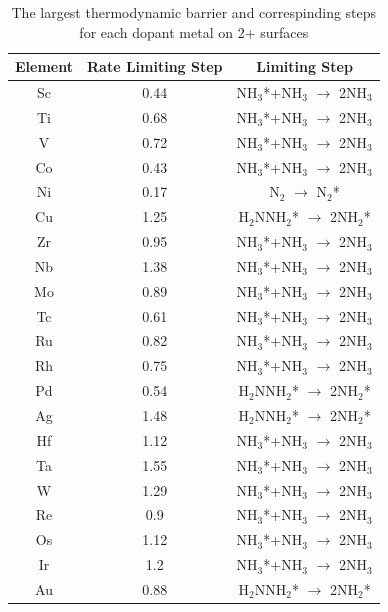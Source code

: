 \begin{table}
\begin{center}
\begin{tabular}{| c | c |c |}
\hline
Element & Rate Limiting Step & Limiting Step \\
\hline
Sc & 0.44 & NH$_3$*+NH$_3$ $\rightarrow$ 2NH$_3$\\
Ti & 0.68 & NH$_3$*+NH$_3$ $\rightarrow$ 2NH$_3$\\
V & 0.72 & NH$_3$*+NH$_3$ $\rightarrow$ 2NH$_3$\\
Co & 0.43 & NH$_3$*+NH$_3$ $\rightarrow$ 2NH$_3$\\
Ni & 0.17 & N$_2$ $\rightarrow$ N$_2$*\\
Cu & 1.25 & H$_2$NNH$_2$* $\rightarrow$ 2NH$_2$*\\
Zr & 0.95 & NH$_3$*+NH$_3$ $\rightarrow$ 2NH$_3$\\
Nb & 1.38 & NH$_3$*+NH$_3$ $\rightarrow$ 2NH$_3$\\
Mo & 0.89 & NH$_3$*+NH$_3$ $\rightarrow$ 2NH$_3$\\
Tc & 0.61 & NH$_3$*+NH$_3$ $\rightarrow$ 2NH$_3$\\
Ru & 0.82 & NH$_3$*+NH$_3$ $\rightarrow$ 2NH$_3$\\
Rh & 0.75 & NH$_3$*+NH$_3$ $\rightarrow$ 2NH$_3$\\
Pd & 0.54 & H$_2$NNH$_2$* $\rightarrow$ 2NH$_2$*\\
Ag & 1.48 & H$_2$NNH$_2$* $\rightarrow$ 2NH$_2$*\\
Hf & 1.12 & NH$_3$*+NH$_3$ $\rightarrow$ 2NH$_3$\\
Ta & 1.55 & NH$_3$*+NH$_3$ $\rightarrow$ 2NH$_3$\\
W & 1.29 & NH$_3$*+NH$_3$ $\rightarrow$ 2NH$_3$\\
Re & 0.9 & NH$_3$*+NH$_3$ $\rightarrow$ 2NH$_3$\\
Os & 1.12 & NH$_3$*+NH$_3$ $\rightarrow$ 2NH$_3$\\
Ir & 1.2 & NH$_3$*+NH$_3$ $\rightarrow$ 2NH$_3$\\
Au & 0.88 & H$_2$NNH$_2$* $\rightarrow$ 2NH$_2$*\\
\hline
\end{tabular}
\end{center}
\caption{The largest thermodynamic barrier and correspinding steps for each dopant metal on 2+ surfaces}\label{table:limiting_steps}\end{table}\begin{figure}
\centering

\end{figure}
